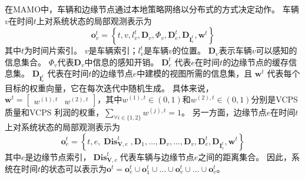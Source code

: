 在MAMO中，车辆和边缘节点通过本地策略网络以分布式的方式决定动作。
车辆$v$在时间$t$上对系统状态的局部观测表示为 
	\begin{equation}
		\boldsymbol{o}_{v}^{t}=\left\{t, v, l_{v}^t, \mathbf{D}_{v}, \Phi_{v}, \mathbf{D}_{e}^{t}, \mathbf{D}_{\mathbf{I}_e^t}, \boldsymbol{w}^{t}\right\}
	\end{equation} 
\noindent 其中$t$为时间片索引。
$v$是车辆索引；$l_{v}^t$是车辆$v$的位置。
$\mathbf{D}_{v}$表示车辆$v$可以感知的信息集合。
$\Phi_{v}$代表$\mathbf{D}_{v}$中信息的感知开销。
$\mathbf{D}_{e}^{t}$ 代表$e$在时间$t$的边缘节点的缓存信息集。
$\mathbf{D}_{\mathbf{I}_e^t}$ 代表在时间$t$的边缘节点$e$中建模的视图所需的信息集，且 $\boldsymbol{w}^{t}$ 代表每个目标的权重向量，它在每次迭代中随机生成。
具体来说，$\boldsymbol{w}^{t} = \begin{bmatrix}  w^{(1), t}  &  w^{(2), t} \end{bmatrix}$，其中$w^{(1), t} \in (0, 1)$和$w^{(2), t} \in (0, 1)$分别是VCPS质量和VCPS 利润的权重，$\sum_{\forall i \in \{1, 2\}} w^{(j), t} = 1$。
另一方面，边缘节点$e$在时间$t$上对系统状态的局部观测表示为
\begin{equation}
	\boldsymbol{o}_{e}^{t}=\left\{t, e, \operatorname{\mathbf{Dis}}_{\mathbf{V}, e}^{t}, \mathbf{D}_{1}, \ldots, \mathbf{D}_{v}, \ldots, \mathbf{D}_{v}, \mathbf{D}_{e}^{t}, \mathbf{D}_{\mathbf{I}_e^t}, \boldsymbol{w}^{t} \right\}
\end{equation}
\noindent 其中$e$是边缘节点索引，$\operatorname{\mathbf{Dis}}_{\mathbf{V}, e}^{t}$代表车辆与边缘节点$e$之间的距离集合。
因此，系统在时间$t$的状态可以表示为$\boldsymbol{o}^{t}=\boldsymbol{o}_{e}^{t} \cup \boldsymbol{o}_{1}^{t} \cup \ldots \cup \boldsymbol{o}_{v}^{t} \cup \ldots \cup \boldsymbol{o}_{v}^{t}$。

